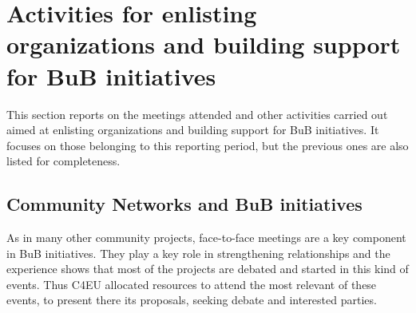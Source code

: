 \section{Activities for enlisting organizations and building support for BuB initiatives}
\label{sec:dissemination}

This section reports on the meetings attended and other activities carried out aimed at enlisting organizations and building support for BuB initiatives. It focuses on those belonging to this reporting period, but the previous ones are also listed for completeness.

\subsection{Community Networks and BuB initiatives}

As in many other community projects, face-to-face meetings are a key component in BuB initiatives. They play a key role in strengthening relationships and the experience shows that most of the projects are debated and started in this kind of events. Thus C4EU allocated resources to attend the most relevant of these events, to present there its proposals, seeking debate and interested parties.


